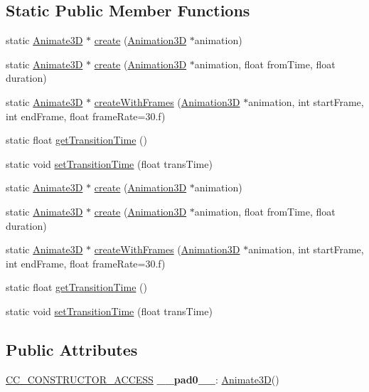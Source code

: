 \subsection*{Static Public Member Functions}
\begin{DoxyCompactItemize}
\item 
static \hyperlink{classAnimate3D}{Animate3D} $\ast$ \hyperlink{classAnimate3D_a06f3e2e2a62513821684d5c406772b22}{create} (\hyperlink{classAnimation3D}{Animation3D} $\ast$animation)
\item 
static \hyperlink{classAnimate3D}{Animate3D} $\ast$ \hyperlink{classAnimate3D_a5362314cf5bdc352f8cfc76501a15a62}{create} (\hyperlink{classAnimation3D}{Animation3D} $\ast$animation, float from\+Time, float duration)
\item 
static \hyperlink{classAnimate3D}{Animate3D} $\ast$ \hyperlink{classAnimate3D_a57bed08df4a445a7aff0cde34abb686d}{create\+With\+Frames} (\hyperlink{classAnimation3D}{Animation3D} $\ast$animation, int start\+Frame, int end\+Frame, float frame\+Rate=30.f)
\item 
static float \hyperlink{classAnimate3D_a50adc250e0012bd6fffc86763854360b}{get\+Transition\+Time} ()
\item 
static void \hyperlink{classAnimate3D_aba0ac7ebee334d4348a945c781a12a66}{set\+Transition\+Time} (float trans\+Time)
\item 
static \hyperlink{classAnimate3D}{Animate3D} $\ast$ \hyperlink{classAnimate3D_a0739534e304f350190b939e7392f7b40}{create} (\hyperlink{classAnimation3D}{Animation3D} $\ast$animation)
\item 
static \hyperlink{classAnimate3D}{Animate3D} $\ast$ \hyperlink{classAnimate3D_a335084c3a2223c250f9b1f1ebded5450}{create} (\hyperlink{classAnimation3D}{Animation3D} $\ast$animation, float from\+Time, float duration)
\item 
static \hyperlink{classAnimate3D}{Animate3D} $\ast$ \hyperlink{classAnimate3D_a1f13b7c0281f969bf7a2fdf6068df78f}{create\+With\+Frames} (\hyperlink{classAnimation3D}{Animation3D} $\ast$animation, int start\+Frame, int end\+Frame, float frame\+Rate=30.f)
\item 
static float \hyperlink{classAnimate3D_a50adc250e0012bd6fffc86763854360b}{get\+Transition\+Time} ()
\item 
static void \hyperlink{classAnimate3D_aba0ac7ebee334d4348a945c781a12a66}{set\+Transition\+Time} (float trans\+Time)
\end{DoxyCompactItemize}
\subsection*{Public Attributes}
\begin{DoxyCompactItemize}
\item 
\mbox{\label{classAnimate3D_afaa091a3c8b8210ab87fc2aae2e28da0}} 
\hyperlink{_2cocos2d_2cocos_2base_2ccConfig_8h_a25ef1314f97c35a2ed3d029b0ead6da0}{C\+C\+\_\+\+C\+O\+N\+S\+T\+R\+U\+C\+T\+O\+R\+\_\+\+A\+C\+C\+E\+SS} {\bfseries \+\_\+\+\_\+pad0\+\_\+\+\_\+}\+: \hyperlink{classAnimate3D}{Animate3D}()
\end{DoxyCompactItemize}
